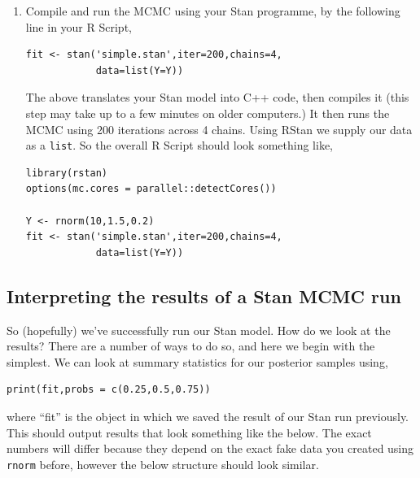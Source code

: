 \documentclass[11pt,fullpage]{book}
\begin{document}
\begin{enumerate}
\item Compile and run the MCMC using your Stan programme, by the following line in your R Script,
\begin{verbatim}
fit <- stan('simple.stan',iter=200,chains=4,
            data=list(Y=Y))
\end{verbatim}
The above translates your Stan model into C++ code, then compiles it (this step may take up to a few minutes on older computers.) It then runs the MCMC using 200 iterations across 4 chains. Using RStan we supply our data as a \texttt{list}. So the overall R Script should look something like,
\begin{verbatim}
library(rstan)
options(mc.cores = parallel::detectCores())

Y <- rnorm(10,1.5,0.2)
fit <- stan('simple.stan',iter=200,chains=4,
            data=list(Y=Y))
\end{verbatim}
\end{enumerate}

\subsection{Interpreting the results of a Stan MCMC run}
So (hopefully) we've successfully run our Stan model. How do we look at the results? There are a number of ways to do so, and here we begin with the simplest. We can look at summary statistics for our posterior samples using,
\begin{verbatim}
print(fit,probs = c(0.25,0.5,0.75))
\end{verbatim}
where ``fit'' is the object in which we saved the result of our Stan run previously. This should output results that look something like the below. The exact numbers will differ because they depend on the exact fake data you created using \texttt{rnorm} before, however the below structure should look similar.
\end{document}
